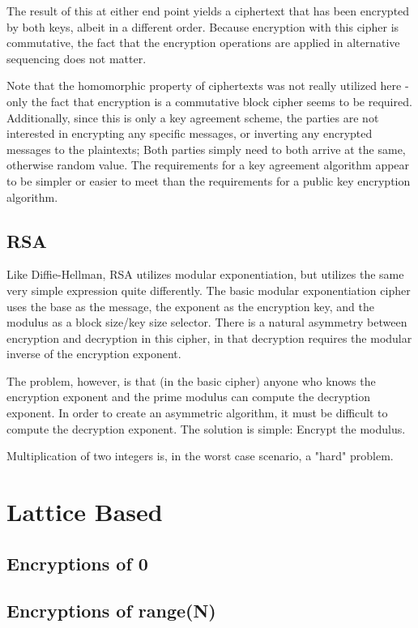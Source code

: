 \documentclass[preprint]{iacrtrans}
\begin{document}
The result of this at either end point yields a ciphertext that has been encrypted by both keys, albeit in a different order. Because encryption with this cipher is commutative, the fact that the encryption operations are applied in alternative sequencing does not matter.

Note that the homomorphic property of ciphertexts was not really utilized here - only the fact that encryption is a commutative block cipher seems to be required. Additionally, since this is only a key agreement scheme, the parties are not interested in encrypting any specific messages, or inverting any encrypted messages to the plaintexts; Both parties simply need to both arrive at the same, otherwise random value. The requirements for a key agreement algorithm appear to be simpler or easier to meet than the requirements for a public key encryption algorithm.

\subsection{RSA}
Like Diffie-Hellman, RSA utilizes modular exponentiation, but utilizes the same very simple expression quite differently. The basic modular exponentiation cipher uses the base as the message, the exponent as the encryption key, and the modulus as a block size/key size selector. There is a natural asymmetry between encryption and decryption in this cipher, in that decryption requires the modular inverse of the encryption exponent. 

The problem, however, is that (in the basic cipher) anyone who knows the encryption exponent and the prime modulus can compute the decryption exponent. In order to create an asymmetric algorithm, it must be difficult to compute the decryption exponent. The solution is simple: Encrypt the modulus.

Multiplication of two integers is, in the worst case scenario, a "hard" problem. 

\section{Lattice Based}
\subsection{Encryptions of 0}
\subsection{Encryptions of range(N)}
\end{document}
